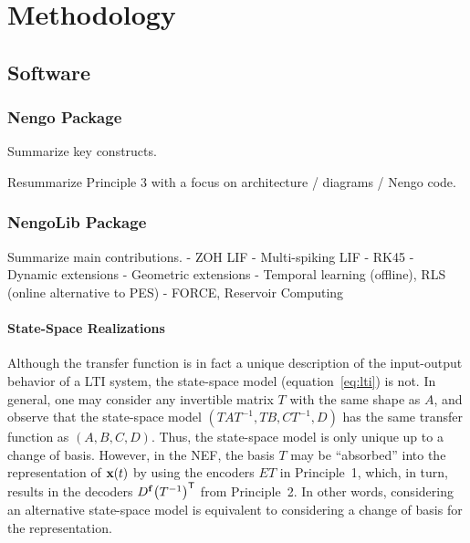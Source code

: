 \chapter{Methodology}
\label{chapt:methodology}


\section{Software}

\subsection{Nengo Package}

Summarize key constructs.

Resummarize Principle 3 with a focus on architecture / diagrams / Nengo code.

\subsection{NengoLib Package}

Summarize main contributions.
 - ZOH LIF
 - Multi-spiking LIF
 - RK45
 - Dynamic extensions
 - Geometric extensions
 - Temporal learning (offline), RLS (online alternative to PES)
 - FORCE, Reservoir Computing

\subsubsection{State-Space Realizations}

Although the transfer function is in fact a unique description of the input-output behavior of a LTI system, the state-space model (equation~\ref{eq:lti}) is not.
In general, one may consider any invertible matrix $T$ with the same shape as $A$, and observe that the state-space model $(TAT^{-1}\text{,}\, TB\text{,}\, CT^{-1}\text{,}\, D)$ has the same transfer function as $(A\text{,}\, B\text{,}\, C\text{,}\, D)$.
Thus, the state-space model is only unique up to a change of basis.
However, in the NEF, the basis $T$ may be ``absorbed'' into the representation of $\mathbf{x}(t)$ by using the encoders $ET$ in Principle~1, which, in turn, results in the decoders $D^{\mathbf{f}} {\left(T^{-1}\right)}^\mathsf{T}$ from Principle~2.
In other words, considering an alternative state-space model is equivalent to considering a change of basis for the representation.

